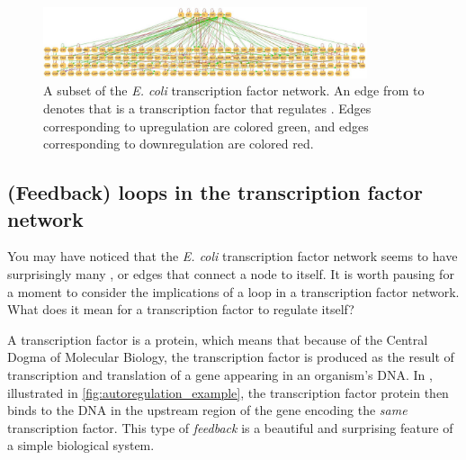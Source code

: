 \begin{figure}[h]
\centering
\mySfFamily
\includegraphics[width = 0.85\textwidth]{../images/e_coli_tf_network.jpeg}
\caption{A subset of the \textit{E. coli} transcription factor network. An edge from  to  denotes that  is a transcription factor that regulates . Edges corresponding to upregulation are colored green, and edges corresponding to downregulation are colored red.}
\label{fig:e_coli_tf_network}
\end{figure}

\begin{qbox}\end{qbox}

\FloatBarrier
{}
\subsection{(Feedback) loops in the transcription factor network}

You may have noticed that the \textit{E. coli} transcription factor network seems to have surprisingly many , or edges that connect a node to itself. It is worth pausing for a moment to consider the implications of a loop in a transcription factor network. What does it mean for a transcription factor to regulate itself?

A transcription factor is a protein, which means that because of the Central Dogma of Molecular Biology, the transcription factor is produced as the result of transcription and translation of a gene appearing in an organism's DNA. In , illustrated in \autoref{fig:autoregulation_example}, the transcription factor protein then binds to the DNA in the upstream region of the gene encoding the \textit{same} transcription factor. This type of \textit{feedback} is a beautiful and surprising feature of a simple biological system.\\

